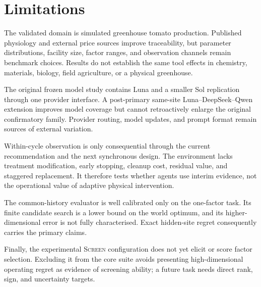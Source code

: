 \section{Limitations}
\label{sec:limitations}

The validated domain is simulated greenhouse tomato production. Published physiology and
external price sources improve traceability, but parameter distributions, facility size,
factor ranges, and observation channels remain benchmark choices. Results do not establish
the same tool effects in chemistry, materials, biology, field agriculture, or a physical
greenhouse.

The original frozen model study contains Luna and a smaller Sol replication through one
provider interface. A post-primary same-site Luna--DeepSeek--Qwen extension improves model
coverage but cannot retroactively enlarge the original confirmatory family. Provider routing,
model updates, and prompt format remain sources of external variation.

Within-cycle observation is only consequential through the current recommendation and the
next synchronous design. The environment lacks treatment modification, early stopping,
cleanup cost, residual value, and staggered replacement. It therefore tests whether agents
use interim evidence, not the operational value of adaptive physical intervention.

The common-history evaluator is well calibrated only on the one-factor task. Its finite
candidate search is a lower bound on the world optimum, and its higher-dimensional error is
not fully characterised. Exact hidden-site regret consequently carries the primary claims.

Finally, the experimental \textsc{Screen} configuration does not yet elicit or score factor
selection. Excluding it from the core suite avoids presenting high-dimensional operating
regret as evidence of screening ability; a future task needs direct rank, sign, and
uncertainty targets.

